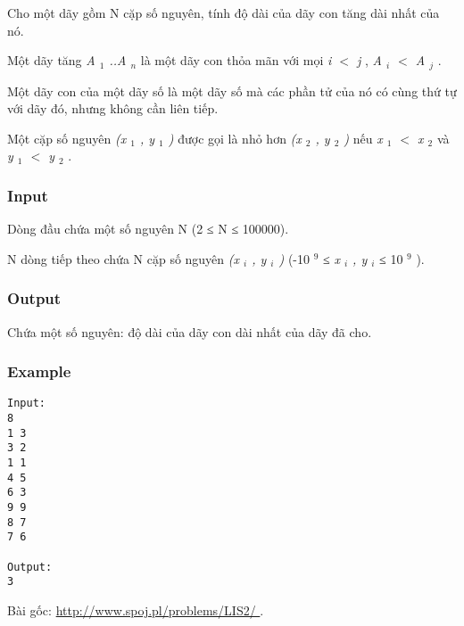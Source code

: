 



   Cho một dãy gồm       N      cặp số nguyên, tính độ dài của       dãy con tăng dài nhất      của nó.  

   Một       dãy tăng      \textit{    A    $_     1    $    ..A    $_     n    $}   là một dãy con thỏa mãn với mọi   \textit{    i $<$ j   }   ,   \textit{    A    $_     i    $    $<$ A    $_     j    $}   .  

   Một       dãy con      của một dãy số là một dãy số mà các phần tử của nó có cùng thứ tự với dãy đó, nhưng không cần liên tiếp.  

   Một cặp số nguyên   \textit{    (x    $_     1    $    , y    $_     1    $    )   }   được gọi là nhỏ hơn   \textit{    (x    $_     2    $    , y    $_     2    $    )   }       nếu      \textit{    x    $_     1    $    $<$ x    $_     2    $}   và   \textit{    y    $_     1    $    $<$ y    $_     2    $}   .  

\subsubsection{   Input  }

   Dòng đầu chứa một số nguyên       N      (2 ≤       N      ≤ 100000).  

       N      dòng tiếp theo chứa       N      cặp số nguyên   \textit{    (x    $_     i    $    , y    $_     i    $    )   }   (-10   $^    9   $   ≤   \textit{    x    $_     i    $    , y    $_     i    $}   ≤ 10   $^    9   $   ).  

\subsubsection{   Output  }

   Chứa một số nguyên: độ dài của dãy con dài nhất của dãy đã cho.  

\subsubsection{   Example  }
\begin{verbatim}
Input:
8
1 3
3 2
1 1
4 5
6 3
9 9
8 7
7 6

Output:
3
\end{verbatim}

   Bài gốc:   \href{http://www.spoj.pl/problems/LIS2/}{    http://www.spoj.pl/problems/LIS2/   }   .  